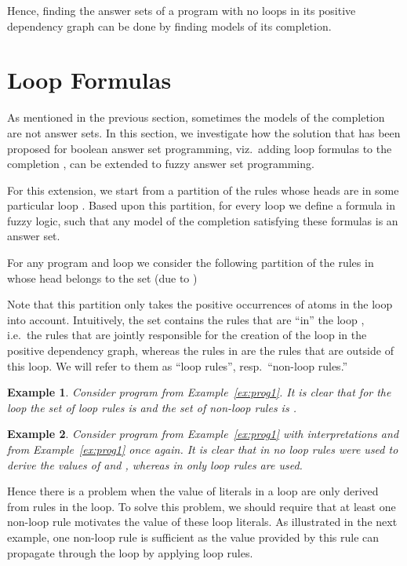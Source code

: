 \documentclass{tlp}
\newtheorem{example}{Example}
\begin{document}
Hence, finding the answer sets of a program with no loops in its positive dependency graph can be done by finding models of its completion.

\section{Loop Formulas}\label{sec:loopelimination}

As mentioned in the previous section, sometimes the models of the completion are not answer sets. In this section, we investigate how the solution that has been proposed for boolean answer set programming, viz.~adding loop formulas to the completion \cite{assat-linzhao}, can be extended to fuzzy answer set programming.

For this extension, we start from a partition of the rules whose heads are in some particular loop . Based upon this partition, for every loop  we define a formula in fuzzy logic, such that any model of the completion satisfying these formulas is an answer set.

For any program  and loop  we consider the following partition of the rules in  whose head belongs to the set  (due to \cite{assat-linzhao})
 

Note that this partition only takes the positive occurrences of atoms in the loop into account.
Intuitively, the set  contains the rules that are ``in'' the loop , i.e.~the rules that are jointly responsible for the creation of the loop in the positive dependency graph, whereas the rules in  are the rules that are outside of this loop. We will refer to them as ``loop rules'', resp.~``non-loop rules.''

\begin{example}
Consider program  from Example~\ref{ex:prog1}. It is clear that for the loop  the set of loop rules is  and the set of non-loop rules is .
\end{example}



\begin{example}
Consider program  from Example~\ref{ex:prog1} with interpretations  and  from Example~\ref{ex:prog1} once again. 
It is clear that in  no loop rules were used to derive the values of  and , whereas in  only loop rules are used. 
\end{example}



Hence there is a problem when the value of literals in a loop are only derived from rules in the loop. To solve this problem, we should require that at least one non-loop rule motivates the value of these loop literals. As illustrated in the next example, one non-loop rule is sufficient as the value provided by this rule can propagate through the loop by applying loop rules.
\end{document}
